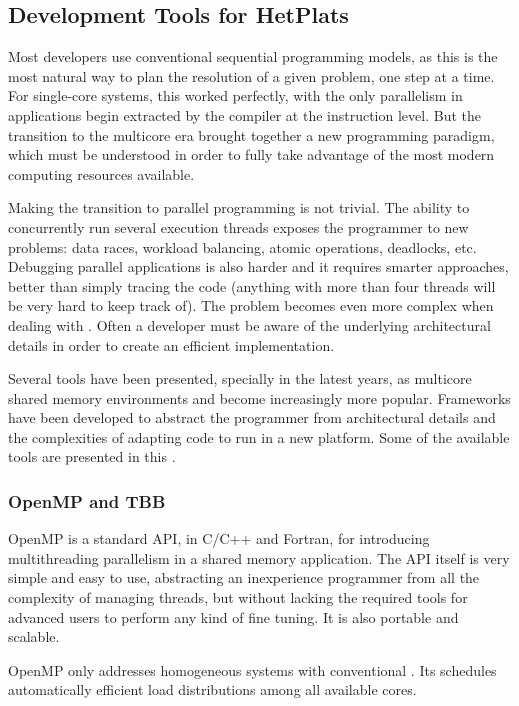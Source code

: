 \subsection{Development Tools for \aclp{HetPlat}}
\label{sec:techbg:software}
Most developers use conventional sequential programming models, as this is the most natural way to plan the resolution of a given problem, one step at a time. For single-core systems, this worked perfectly, with the only parallelism in applications begin extracted by the compiler at the instruction level. But the transition to the multicore era brought together a new programming paradigm, which must be understood in order to fully take advantage of the most modern computing resources available.

Making the transition to parallel programming is not trivial. The ability to concurrently run several execution threads exposes the programmer to new problems: data races, workload balancing, atomic operations, deadlocks, etc. Debugging parallel applications is also harder and it requires smarter approaches, better than simply tracing the code (anything with more than four threads will be very hard to keep track of). The problem becomes even more complex when dealing with \hetplats. Often a developer must be aware of the underlying architectural details in order to create an efficient implementation.

Several tools have been presented, specially in the latest years, as multicore shared memory environments and \hetplats become increasingly more popular. Frameworks have been developed to abstract the programmer from architectural details and the complexities of adapting code to run in a new platform. Some of the available tools are presented in this .

\subsubsection{OpenMP and \acs{TBB}}
OpenMP\cite{OpenMP:3.1} is a standard API, in C/C++ and Fortran, for introducing multithreading parallelism in a shared memory application. The API itself is very simple and easy to use, abstracting an inexperience programmer from all the complexity of managing threads, but without lacking the required tools for advanced users to perform any kind of fine tuning. It is also portable and scalable.

OpenMP only addresses homogeneous systems with conventional \cpus. Its schedules automatically efficient load distributions among all available cores.

